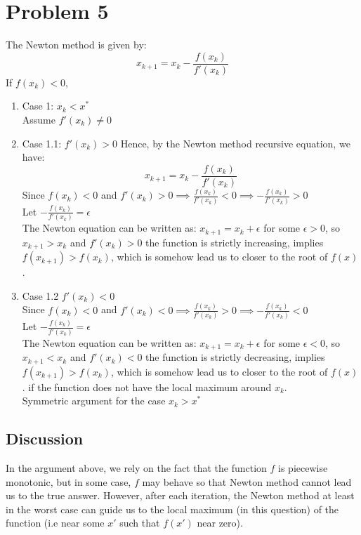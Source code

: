 \documentclass[11pt]{article}
\newcommand{\1}{\mathbbm{1}}
\begin{document}
\section*{Problem 5}
The Newton method is given by:
$$x_{k+1} = x_k -\frac{f(x_k)}{f'(x_k)}$$
If $f(x_k) < 0$,
\begin{enumerate}
	\item Case 1: $ x_k < x^* $\\
	Assume $f'(x_k) \neq 0 $
	\item Case 1.1: $f'(x_k) > 0 $
	Hence, by the Newton method recursive equation, we have:
	$$x_{k+1} = x_k -\frac{f(x_k)}{f'(x_k)}$$
	Since $f(x_k) <0$ and $f'(x_k) > 0 \implies \frac{f(x_k)}{f'(x_k)} < 0 \implies -\frac{f(x_k)}{f'(x_k)}>0$\\
	Let $-\frac{f(x_k)}{f'(x_k)} = \epsilon$\\
	The Newton equation can be written as:
	$x_{k+1} = x_k + \epsilon$ for some $\epsilon >0$, so $x_{k+1}>x_k$ and $f'(x_k) > 0$ the function is strictly increasing, implies $f(x_{k+1}) > f(x_k)$, which is somehow lead us to closer to the root of $f(x)$.
	
	\item Case 1.2 $f'(x_k)<0$\\
	Since $f(x_k) <0$ and $f'(x_k) < 0 \implies \frac{f(x_k)}{f'(x_k)} > 0 \implies -\frac{f(x_k)}{f'(x_k)}<0$\\
	Let $-\frac{f(x_k)}{f'(x_k)} = \epsilon$\\
	The Newton equation can be written as:
	$x_{k+1} = x_k + \epsilon$ for some $\epsilon <0$, so $x_{k+1}<x_k$ and $f'(x_k) < 0$ the function is strictly decreasing, implies $f(x_{k+1}) > f(x_k)$, which is somehow lead us to closer to the root of $f(x)$. if the function does not have the local maximum around $x_k$.\\
	Symmetric argument for the case $x_k > x^*$\\
\end{enumerate}

	\subsection*{Discussion}
	In the argument above, we rely on the fact that the function $f$ is piecewise monotonic, but in some case, $f$ may behave so that Newton method cannot lead us to the true answer. However, after each iteration, the Newton method at least in the worst case can guide us to the local maximum (in this question) of the function (i.e near some $x'$ such that $f(x')$ near zero).
	
\end{document}
